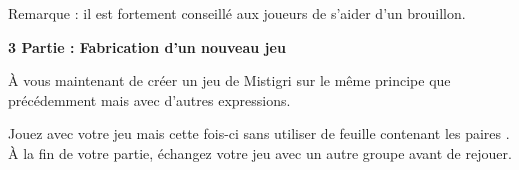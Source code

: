 \begin{TP}
\vspace{.5em}
Remarque : il est fortement conseillé aux joueurs de s'aider d'un brouillon.


\vspace{1em}\textbf{3 Partie : Fabrication d'un nouveau jeu}\vspace{1em}


\item À vous maintenant de créer un jeu de Mistigri sur le même principe que précédemment mais avec d'autres expressions.
\item Jouez avec votre jeu mais cette fois-ci sans utiliser de feuille contenant les \og paires \fg. À la fin de votre partie, échangez votre jeu avec un autre groupe avant de rejouer.

\end{TP}
